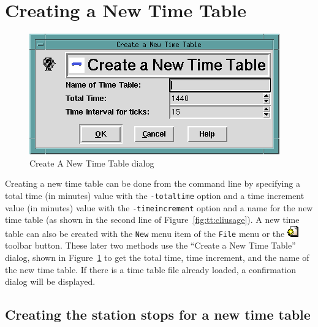 \section{Creating a New Time Table}
\label{sect:tt:createnewtimetable}

\begin{figure}[hbpt]
\begin{centering}
\includegraphics{TTCreateNewTT.png}
\caption{Create A New Time Table dialog}
\label{fig:tt:GetNewTimeTableDialog}
\end{centering}
\end{figure}
Creating a new time table can be done from the command line by
specifying a total time (in minutes) value with the \texttt{-totaltime}
option and a time increment value (in minutes) value with the
\texttt{-timeincrement} option and a name for the new time table (as
shown in the second line of Figure~\ref{fig:tt:cliusage}).  A new time
table can also be created with the \texttt{New} menu item of the
\texttt{File} menu or the
\includegraphics{TTNewTool.png} toolbar button. These later two methods
use the ``Create a New Time Table'' dialog, shown in
Figure~\ref{fig:tt:GetNewTimeTableDialog} to get the total time, time
increment, and the name of the new time table.  If there is a time
table file already loaded, a confirmation dialog will be displayed.

\subsection{Creating the station stops for a new time table}
\label{sect:tt:CreateAllStationsDialog}

